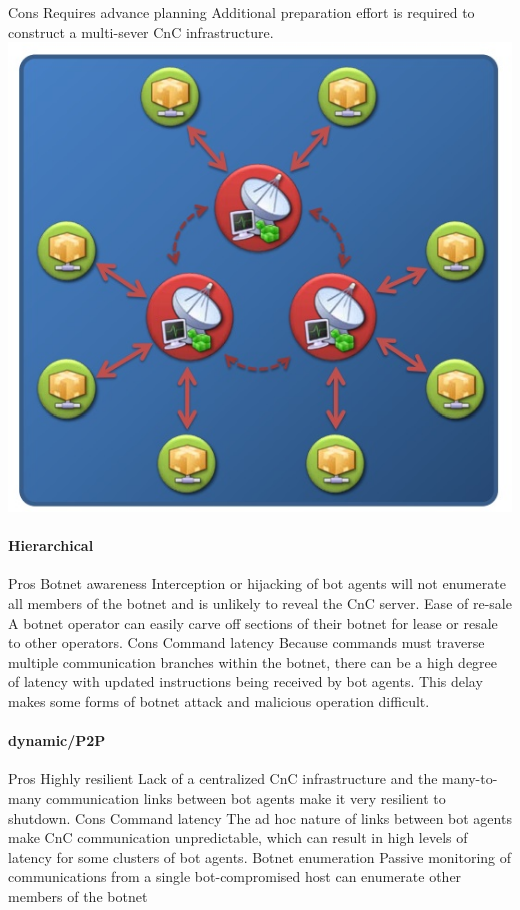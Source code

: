     Cons
Requires advance planning
Additional preparation effort is required to construct a multi-sever CnC infrastructure.\\
\includegraphics[scale=1]{img/multi-server_topo.jpg}

\paragraph{Hierarchical}
    Pros 
  Botnet awareness
Interception or hijacking of bot agents
will not enumerate all members of the
botnet and is unlikely to reveal the CnC
server.
  Ease of re-sale
A botnet operator can easily carve off
sections of their botnet for lease or resale
to other operators.
    Cons
  Command latency
Because commands must traverse
multiple communication branches within
the botnet, there can be a high degree of
latency with updated instructions being
received by bot agents. This delay makes
some forms of botnet attack and
malicious operation difficult.

\paragraph{dynamic/P2P}
    Pros 
  Highly resilient
Lack of a centralized CnC infrastructure
and the many-to-many communication
links between bot agents make it very
resilient to shutdown.
    Cons
  Command latency
The ad hoc nature of links between bot
agents make CnC communication
unpredictable, which can result in high
levels of latency for some clusters of bot
agents.
  Botnet enumeration
Passive monitoring of communications
from a single bot-compromised host can
enumerate other members of the botnet

